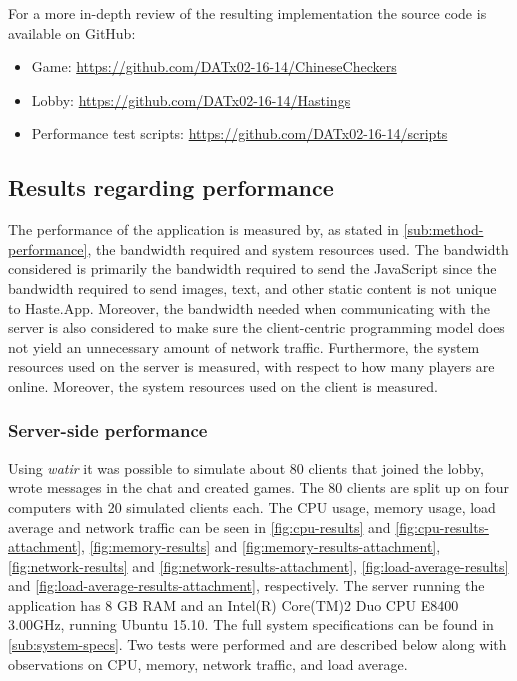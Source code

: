 \documentclass[a4paper]{article}
\begin{document}

For a more in-depth review of the resulting implementation the source code is available on GitHub:
\begin{itemize}[noitemsep]
    \item Game: \url{https://github.com/DATx02-16-14/ChineseCheckers}
    \item Lobby: \url{https://github.com/DATx02-16-14/Hastings}
    \item Performance test scripts: \url{https://github.com/DATx02-16-14/scripts}
\end{itemize}



\subsection{Results regarding performance}
\label{sub:performance-results}
The performance of the application is measured by, as stated in \cref{sub:method-performance}, the bandwidth required and system resources used. The bandwidth considered is primarily the bandwidth required to send the JavaScript since the bandwidth required to send images, text, and other static content is not unique to Haste.App. Moreover, the bandwidth needed when communicating with the server is also considered to make sure the client-centric programming model does not yield an unnecessary amount of network traffic. Furthermore, the system resources used on the server is measured, with respect to how many players are online. Moreover, the system resources used on the client is measured.


\subsubsection{Server-side performance}
\label{subsub:server-performance-results}
Using \textit{watir} it was possible to simulate about 80 clients that joined the lobby, wrote messages in the chat and created games. The 80 clients are split up on four computers with 20 simulated clients each. The CPU usage, memory usage, load average and network traffic can be seen in \cref{fig:cpu-results} and \cref{fig:cpu-results-attachment}, \cref{fig:memory-results} and \cref{fig:memory-results-attachment}, \cref{fig:network-results} and \cref{fig:network-results-attachment}, \cref{fig:load-average-results} and \cref{fig:load-average-results-attachment}, respectively. The server running the application has 8 GB RAM and an Intel(R) Core(TM)2 Duo CPU E8400 3.00GHz, running Ubuntu 15.10. The full system specifications can be found in \cref{sub:system-specs}. Two tests were performed and are described below along with observations on CPU, memory, network traffic, and load average.
\end{document}
